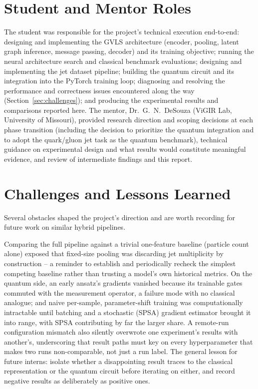 \documentclass[11pt]{article}
\begin{document}
\section*{Student and Mentor Roles}


The student was responsible for the project's technical execution
end-to-end: designing and implementing the GVLS architecture (encoder,
pooling, latent graph inference, message passing, decoder) and its training
objective; running the neural architecture search and classical benchmark
evaluations; designing and implementing the jet dataset pipeline; building
the quantum circuit and its integration into the PyTorch training loop;
diagnosing and resolving the performance and correctness issues encountered
along the way (Section~\ref{sec:challenges}); and producing the experimental
results and comparisons reported here. The mentor,
Dr.\ G.\ N.\ DeSouza (ViGIR Lab, University of Missouri), provided research
direction and scoping decisions at each phase transition (including the
decision to prioritize the quantum integration and to adopt the
quark/gluon jet task as the quantum benchmark), technical guidance on
experimental design and what results would constitute meaningful evidence,
and review of intermediate findings and this report.


\section*{Challenges and Lessons Learned}
\label{sec:challenges}

Several obstacles shaped the project's direction and are worth recording for
future work on similar hybrid pipelines.

Comparing the full pipeline against a trivial one-feature baseline (particle
count alone) exposed that fixed-size pooling was discarding jet multiplicity
by construction -- a reminder to establish and periodically recheck the
simplest competing baseline rather than trusting a model's own historical
metrics. On the quantum side, an early ansatz's gradients vanished because
its trainable gates commuted with the measurement operator, a failure mode
with no classical analogue; and naive per-sample, parameter-shift training
was computationally intractable until batching and a stochastic (SPSA)
gradient estimator brought it into range, with SPSA contributing by far the
larger share. A remote-run configuration mismatch also silently overwrote
one experiment's results with another's, underscoring that result paths
must key on every hyperparameter that makes two runs non-comparable, not
just a run label. The general lesson for future interns: isolate whether a
disappointing result traces to the classical representation or the quantum
circuit before iterating on either, and record negative results as
deliberately as positive ones.
\end{document}
